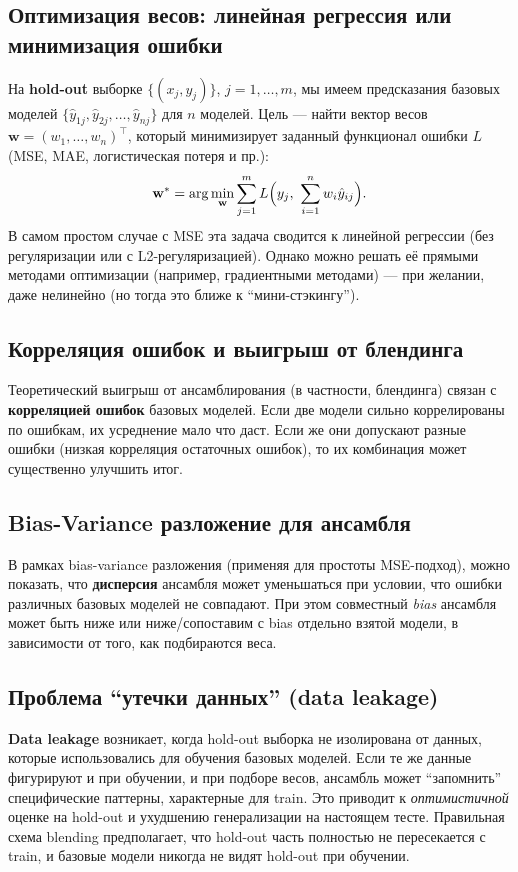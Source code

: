 \subsection{Оптимизация весов: линейная регрессия или минимизация ошибки}
На \textbf{hold-out} выборке $\{(x_j, y_j)\}$, $j=1,\ldots,m$, мы имеем предсказания базовых моделей $ \{\hat{y}_{1j}, \hat{y}_{2j}, \dots, \hat{y}_{nj}\}$ для $n$ моделей. Цель --- найти вектор весов $\mathbf{w} = (w_1, \ldots, w_n)^\top$, который минимизирует заданный функционал ошибки $L$ (MSE, MAE, логистическая потеря и пр.):
\[
\mathbf{w}^* = \arg\min_{\mathbf{w}} \sum_{j=1}^m L\Bigl(y_j,\ \sum_{i=1}^n w_i \hat{y}_{ij}\Bigr).
\]
В самом простом случае с MSE эта задача сводится к линейной регрессии (без регуляризации или с L2-регуляризацией). Однако можно решать её прямыми методами оптимизации (например, градиентными методами) --- при желании, даже нелинейно (но тогда это ближе к ``мини-стэкингу'').

\subsection{Корреляция ошибок и выигрыш от блендинга}
Теоретический выигрыш от ансамблирования (в частности, блендинга) связан с \textbf{корреляцией ошибок} базовых моделей. Если две модели сильно коррелированы по ошибкам, их усреднение мало что даст. Если же они допускают разные ошибки (низкая корреляция остаточных ошибок), то их комбинация может существенно улучшить итог.

\subsection{Bias-Variance разложение для ансамбля}
В рамках bias-variance разложения (применяя для простоты MSE-подход), можно показать, что \textbf{дисперсия} ансамбля может уменьшаться при условии, что ошибки различных базовых моделей не совпадают. При этом совместный \textit{bias} ансамбля может быть ниже или ниже/сопоставим с bias отдельно взятой модели, в зависимости от того, как подбираются веса. 

\subsection{Проблема ``утечки данных'' (data leakage)}
\textbf{Data leakage} возникает, когда hold-out выборка не изолирована от данных, которые использовались для обучения базовых моделей. Если те же данные фигурируют и при обучении, и при подборе весов, ансамбль может ``запомнить'' специфические паттерны, характерные для train. Это приводит к \textit{оптимистичной} оценке на hold-out и ухудшению генерализации на настоящем тесте. Правильная схема blending предполагает, что hold-out часть полностью не пересекается с train, и базовые модели никогда не видят hold-out при обучении.

